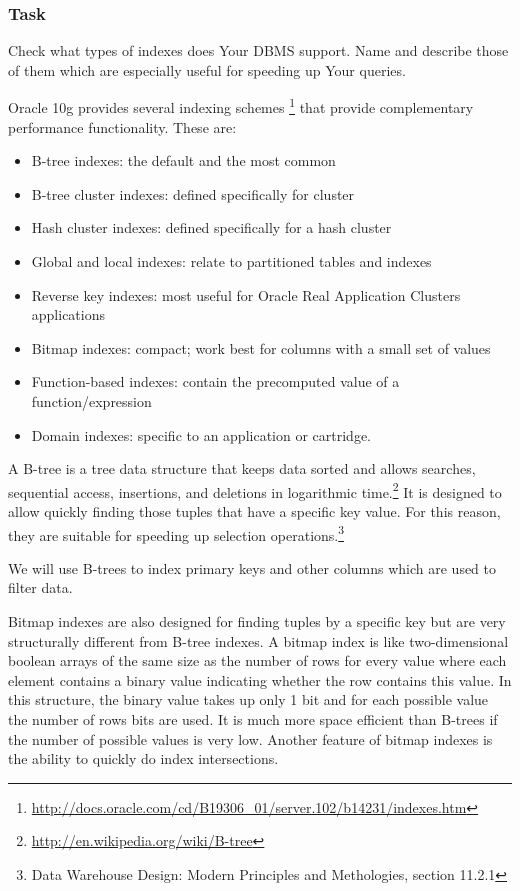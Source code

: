 \subsubsection*{Task} 
Check what types of indexes does Your DBMS support. Name and describe those of them which are especially useful for speeding up Your
queries.\newline

\noindent Oracle 10g provides several indexing schemes
\footnote{\url{http://docs.oracle.com/cd/B19306_01/server.102/b14231/indexes.htm}}
that provide complementary performance functionality. These are:
\begin{itemize}
\item B-tree indexes: the default and the most common
\item B-tree cluster indexes: defined specifically for cluster
\item Hash cluster indexes: defined specifically for a hash cluster
\item Global and local indexes: relate to partitioned tables and indexes
\item Reverse key indexes: most useful for Oracle Real Application Clusters applications
\item Bitmap indexes: compact; work best for columns with a small set of values
\item Function-based indexes: contain the precomputed value of a function/expression
\item Domain indexes: specific to an application or cartridge.
\end{itemize}

A B-tree is a tree data structure that keeps data sorted and allows searches, sequential access, insertions, and deletions in logarithmic time.\footnote{\url{http://en.wikipedia.org/wiki/B-tree}} It is designed to allow quickly finding those tuples that have a specific key value. For this reason, they are suitable for speeding up selection operations.\footnote{Data Warehouse Design: Modern Principles and Methologies, section 11.2.1}

We will use B-trees to index primary keys and other columns which are used to filter data.

Bitmap indexes are also designed for finding tuples by a specific key but are very structurally different from B-tree indexes. A bitmap index is like two-dimensional boolean arrays of the same size as the number of rows for every value where each element contains a binary value indicating whether the row contains this value. In this structure, the binary value takes up only 1 bit and for each possible value the number of rows bits are used. It is much more space efficient than B-trees if the number of possible values is very low. Another feature of bitmap indexes is the ability to quickly do index intersections.

